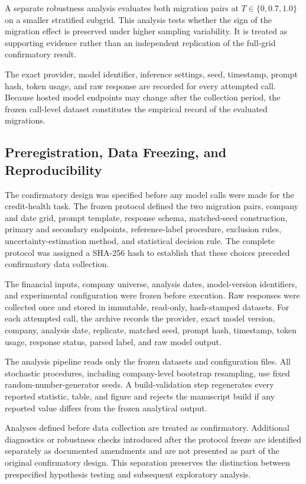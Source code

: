 \documentclass[11pt]{article}
\begin{document}
A separate robustness analysis evaluates both migration pairs at $T\in\{0,0.7,1.0\}$ on a smaller stratified subgrid. This analysis tests whether the sign of the migration effect is preserved under higher sampling variability. It is treated as supporting evidence rather than an independent replication of the full-grid confirmatory result.

The exact provider, model identifier, inference settings, seed, timestamp, prompt hash, token usage, and raw response are recorded for every attempted call. Because hosted model endpoints may change after the collection period, the frozen call-level dataset constitutes the empirical record of the evaluated migrations.

\subsection{Preregistration, Data Freezing, and Reproducibility}
\label{subsec:freeze}
The confirmatory design was specified before any model calls were made for the credit-health task. The frozen protocol defined the two migration pairs, company and date grid, prompt template, response schema, matched-seed construction, primary and secondary endpoints, reference-label procedure, exclusion rules, uncertainty-estimation method, and statistical decision rule. The complete protocol was assigned a SHA-256 hash to establish that these choices preceded confirmatory data collection.

The financial inputs, company universe, analysis dates, model-version identifiers, and experimental configuration were frozen before execution. Raw responses were collected once and stored in immutable, read-only, hash-stamped datasets. For each attempted call, the archive records the provider, exact model version, company, analysis date, replicate, matched seed, prompt hash, timestamp, token usage, response status, parsed label, and raw model output.

The analysis pipeline reads only the frozen datasets and configuration files. All stochastic procedures, including company-level bootstrap resampling, use fixed random-number-generator seeds. A build-validation step regenerates every reported statistic, table, and figure and rejects the manuscript build if any reported value differs from the frozen analytical output.

Analyses defined before data collection are treated as confirmatory. Additional diagnostics or robustness checks introduced after the protocol freeze are identified separately as documented amendments and are not presented as part of the original confirmatory design. This separation preserves the distinction between prespecified hypothesis testing and subsequent exploratory analysis.
\end{document}
